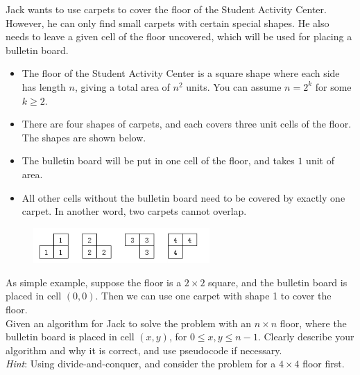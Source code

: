 \problem{}
Jack wants to use carpets to cover the floor of the Student Activity Center. However, he can only find small carpets with certain special shapes.  He also needs to leave a given cell of the floor uncovered, which will be used for placing a bulletin board.
\begin{itemize}
    \item The floor of the Student Activity Center is a square shape where each side has length $n$, giving a total area of $n^{2}$ units.  You can assume $n = 2^{k}$ for some $k \geq 2$.
    \item There are four shapes of carpets, and each covers three unit cells of the floor. The shapes are shown below.
    \item The bulletin board will be put in one cell of the floor, and takes $1$ unit of area.
    \item All other cells without the bulletin board need to be covered by exactly one carpet. In another word, two carpets cannot overlap.
\end{itemize}
\begin{figure}[h]
     \centering
     \includegraphics[width=0.6\textwidth]{figure/p5f1.png}
     \label{fig:carpet}
\end{figure}

As simple example, suppose the floor is a $2 \times 2$ square, and the bulletin board is placed in cell $(0,0)$.  Then we can use one carpet with shape 1 to cover the floor. \\

Given an algorithm for Jack to solve the problem with an $n \times n$ floor, where the bulletin board is placed in cell $(x,y)$, for $0 \leq x, y \leq n-1$.  Clearly describe your algorithm and why it is correct, and use pseudocode if necessary. \\

\emph{Hint}: Using divide-and-conquer, and consider the problem for a $4\times4$ floor first.

\solution{

}

\newpage